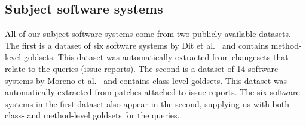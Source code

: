 
\subsection{Subject software systems}

All of our subject software systems come from two publicly-available datasets.
The first is a dataset of six software systems by Dit et al.~\cite{Dit-etal:2013} and contains method-level goldsets.
This dataset was automatically extracted from changesets that relate to the queries (issue reports).
The second is a dataset of 14 software systems by Moreno et al.~\cite{Moreno-etal:2014} and contains class-level goldsets.
This dataset was automatically extracted from patches attached to issue reports.
The six software systems in the first dataset also appear in the second,
supplying us with both class- and method-level goldsets for the queries.

